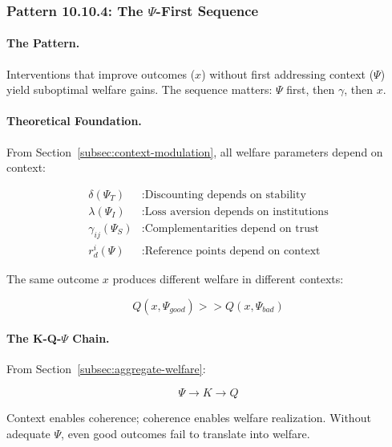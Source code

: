 \subsubsection{Pattern 10.10.4: The $\Psi$-First Sequence}
\label{subsubsec:psi-first}

\paragraph{The Pattern.}
Interventions that improve outcomes ($x$) without first addressing context 
($\Psi$) yield suboptimal welfare gains. The sequence matters: $\Psi$ first, 
then $\gamma$, then $x$.

\paragraph{Theoretical Foundation.}
From Section~\ref{subsec:context-modulation}, all welfare parameters depend on context:

\begin{align}
\delta(\Psi_T) &: \text{Discounting depends on stability} \\
\lambda(\Psi_I) &: \text{Loss aversion depends on institutions} \\
\gamma_{ij}(\Psi_S) &: \text{Complementarities depend on trust} \\
r^i_d(\Psi) &: \text{Reference points depend on context}
\end{align}

The same outcome $x$ produces different welfare in different contexts:

\begin{equation}
Q(x, \Psi_{good}) >> Q(x, \Psi_{bad})
\end{equation}

\paragraph{The K-Q-$\Psi$ Chain.}
From Section~\ref{subsec:aggregate-welfare}:

\begin{equation}
\Psi \longrightarrow K \longrightarrow Q
\end{equation}

Context enables coherence; coherence enables welfare realization.
Without adequate $\Psi$, even good outcomes fail to translate into welfare.

